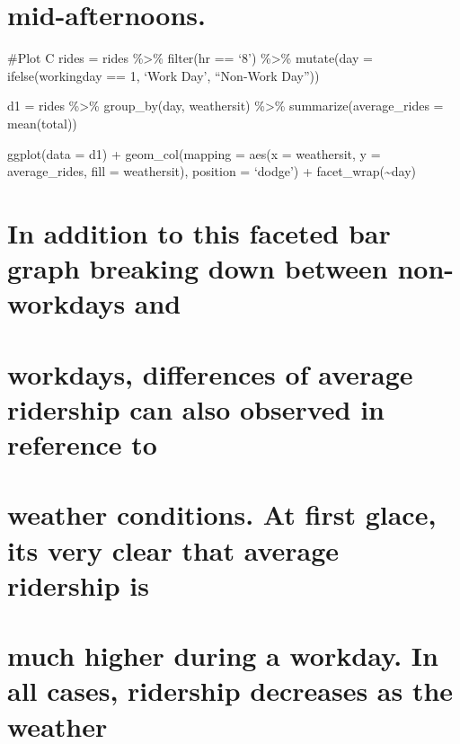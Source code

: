 \documentclass[
]{article}
\begin{document}
\hypertarget{mid-afternoons.}{%
\section{mid-afternoons.}\label{mid-afternoons.}}

\#Plot C rides = rides \%\textgreater\% filter(hr == `8')
\%\textgreater\% mutate(day = ifelse(workingday == 1, `Work Day',
``Non-Work Day''))

d1 = rides \%\textgreater\% group\_by(day, weathersit) \%\textgreater\%
summarize(average\_rides = mean(total))

ggplot(data = d1) + geom\_col(mapping = aes(x = weathersit, y =
average\_rides, fill = weathersit), position = `dodge') +
facet\_wrap(\textasciitilde day)

\hypertarget{in-addition-to-this-faceted-bar-graph-breaking-down-between-non-workdays-and}{%
\section{In addition to this faceted bar graph breaking down between
non-workdays
and}\label{in-addition-to-this-faceted-bar-graph-breaking-down-between-non-workdays-and}}

\hypertarget{workdays-differences-of-average-ridership-can-also-observed-in-reference-to}{%
\section{workdays, differences of average ridership can also observed in
reference
to}\label{workdays-differences-of-average-ridership-can-also-observed-in-reference-to}}

\hypertarget{weather-conditions.-at-first-glace-its-very-clear-that-average-ridership-is}{%
\section{weather conditions. At first glace, its very clear that average
ridership
is}\label{weather-conditions.-at-first-glace-its-very-clear-that-average-ridership-is}}

\hypertarget{much-higher-during-a-workday.-in-all-cases-ridership-decreases-as-the-weather}{%
\section{much higher during a workday. In all cases, ridership decreases
as the
weather}\label{much-higher-during-a-workday.-in-all-cases-ridership-decreases-as-the-weather}}
\end{document}
